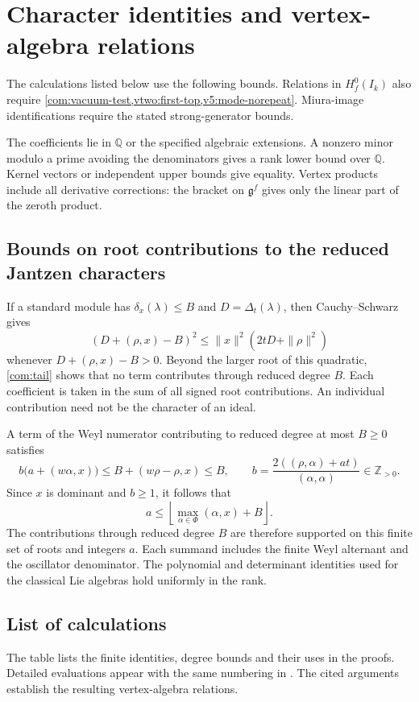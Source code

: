 \documentclass[11pt,a4paper]{amsart}
\numberwithin{equation}{section}
\theoremstyle{definition}
\theoremstyle{remark}
\newcommand{\Z}{\mathbb Z}
\newcommand{\Q}{\mathbb Q}
\newcommand{\g}{\mathfrak g}
\begin{document}
\appendix
\section{Character identities and vertex-algebra relations}\label{app:calculations}
The calculations listed below use the following bounds. Relations in $H_f^0(I_k)$
also require \cref{com:vacuum-test,vtwo:first-top,v5:mode-norepeat}.
Miura-image identifications require the stated strong-generator bounds.

The coefficients lie in $\Q$ or the specified algebraic extensions.
A nonzero minor modulo a prime avoiding the denominators gives a
rank lower bound over $\Q$. Kernel vectors or independent upper bounds
give equality. Vertex products include all derivative corrections:
the bracket on $\g^f$ gives only the linear part of the zeroth product.

\subsection{Bounds on root contributions to the reduced Jantzen characters}
\label{cert:scope}\label{sec:external-inputs}
If a standard module has $\delta_x(\lambda)\le B$ and
$D=\Delta_t(\lambda)$, then Cauchy--Schwarz gives
$$
 (D+(\rho,x)-B)^2\le\|x\|^2(2tD+\|\rho\|^2)
$$
whenever $D+(\rho,x)-B>0$. Beyond the larger root of this quadratic,
\cref{com:tail} shows that no term contributes through reduced degree $B$.
Each coefficient is taken in the sum of all signed root contributions.
An individual contribution need not be the character of an ideal.

A term of the Weyl numerator contributing
to reduced degree at most $B\ge0$ satisfies
$$
 b\bigl(a+(w\alpha,x)\bigr)
 \le B+(w\rho-\rho,x)\le B,
 \qquad b=\frac{2((\rho,\alpha)+at)}{(\alpha,\alpha)}\in\Z_{>0}.
$$
Since $x$ is dominant and $b\ge1$, it follows that
$$
 a\le\left\lfloor\max_{\alpha\in\Phi}(\alpha,x)+B\right\rfloor.
$$
The contributions through reduced degree $B$ are therefore supported
on this finite set of roots and integers $a$. Each summand includes the
finite Weyl alternant and the oscillator denominator. The polynomial
and determinant identities used for the classical Lie algebras hold
uniformly in the rank.

\subsection{List of calculations}
The table lists the finite identities, degree bounds and their uses
in the proofs. Detailed evaluations appear with the same numbering in
\cite{Certificates}. The cited arguments establish the resulting
vertex-algebra relations.
\end{document}
